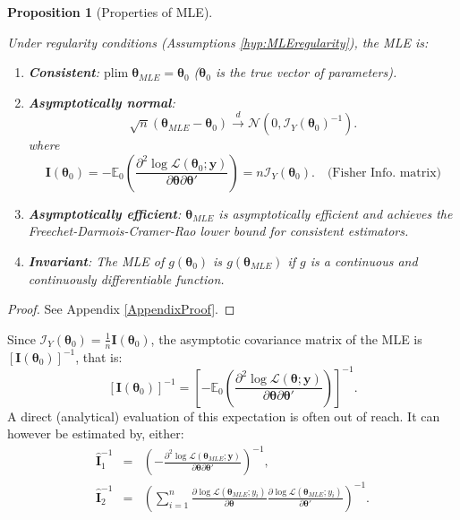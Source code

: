 \documentclass[
  12pt,
]{book}
\providecommand{\tightlist}{%
  \setlength{\itemsep}{0pt}\setlength{\parskip}{0pt}}
\newtheorem{proposition}{Proposition}[chapter]
\theoremstyle{definition}
\theoremstyle{definition}
\theoremstyle{definition}
\theoremstyle{definition}
\theoremstyle{remark}
\begin{document}
\begin{proposition}[Properties of MLE]
\protect\hypertarget{prp:MLEproperties}{}\label{prp:MLEproperties}

Under regularity conditions (Assumptions \ref{hyp:MLEregularity}), the MLE is:

\begin{enumerate}
\def\labelenumi{\alph{enumi}.}
\tightlist
\item
  \textbf{Consistent}: \(\mbox{plim}\; \boldsymbol\theta_{MLE} = {\boldsymbol\theta}_0\) (\({\boldsymbol\theta}_0\) is the true vector of parameters).
\item
  \textbf{Asymptotically normal}:
  \begin{equation}
  \boxed{\sqrt{n}(\boldsymbol\theta_{MLE} - \boldsymbol\theta_{0}) \overset{d}{\rightarrow} \mathcal{N}(0,\mathcal{I}_Y(\boldsymbol\theta_0)^{-1}).} \label{eq:normMLE}
  \end{equation}
  where
  \[
  \mathbf{I}(\boldsymbol\theta_0) = - \mathbb{E}_0 \left( \frac{\partial^2 \log \mathcal{L}({\boldsymbol\theta_0};\mathbf{y})}{\partial \boldsymbol\theta \partial \boldsymbol\theta'}\right) = n \mathcal{I}_Y(\boldsymbol\theta_0). \quad \mbox{(Fisher Info. matrix)}
  \]
\item
  \textbf{Asymptotically efficient}: \(\boldsymbol\theta_{MLE}\) is asymptotically efficient and achieves the Freechet-Darmois-Cramer-Rao lower bound for consistent estimators.
\item
  \textbf{Invariant}: The MLE of \(g(\boldsymbol\theta_0)\) is \(g(\boldsymbol\theta_{MLE})\) if \(g\) is a continuous and continuously differentiable function.
\end{enumerate}

\end{proposition}

\begin{proof}
See Appendix \ref{AppendixProof}.
\end{proof}

Since \(\mathcal{I}_Y(\boldsymbol\theta_0)=\frac{1}{n}\mathbf{I}(\boldsymbol\theta_0)\), the asymptotic covariance matrix of the MLE is \([\mathbf{I}(\boldsymbol\theta_0)]^{-1}\), that is:
\[
[\mathbf{I}(\boldsymbol\theta_0)]^{-1} = \left[- \mathbb{E}_0 \left( \frac{\partial^2 \log \mathcal{L}(\boldsymbol\theta;\mathbf{y})}{\partial \boldsymbol\theta \partial \boldsymbol\theta'}\right) \right]^{-1}.
\]
A direct (analytical) evaluation of this expectation is often out of reach. It can however be estimated by, either:
\begin{eqnarray}
\hat{\mathbf{I}}_1^{-1} &=&  \left( - \frac{\partial^2 \log \mathcal{L}({\boldsymbol\theta_{MLE}};\mathbf{y})}{\partial {\boldsymbol\theta} \partial {\boldsymbol\theta}'}\right)^{-1}, \label{eq:III1}\\
\hat{\mathbf{I}}_2^{-1} &=&  \left( \sum_{i=1}^n \frac{\partial \log \mathcal{L}({\boldsymbol\theta_{MLE}};y_i)}{\partial {\boldsymbol\theta}} \frac{\partial \log \mathcal{L}({\boldsymbol\theta_{MLE}};y_i)}{\partial {\boldsymbol\theta'}} \right)^{-1}.  \label{eq:I2}
\end{eqnarray}
\end{document}
